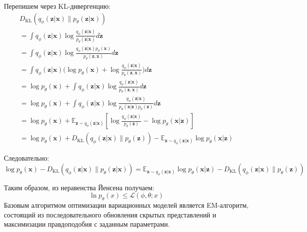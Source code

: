 Перепишем через KL-дивергенцию:
\begin{equation}
    \begin{aligned}
        & D_\text{KL}( q_\phi(\mathbf{z}\vert\mathbf{x}) \| p_\theta(\mathbf{z}\vert\mathbf{x}) ) & \\
        &=\int q_\phi(\mathbf{z} \vert \mathbf{x}) \log\frac{q_\phi(\mathbf{z} \vert \mathbf{x})}{p_\theta(\mathbf{z} \vert \mathbf{x})} d\mathbf{z} & \\
        &=\int q_\phi(\mathbf{z} \vert \mathbf{x}) \log\frac{q_\phi(\mathbf{z} \vert \mathbf{x})p_\theta(\mathbf{x})}{p_\theta(\mathbf{z}, \mathbf{x})} d\mathbf{z}\\
        &=\int q_\phi(\mathbf{z} \vert \mathbf{x}) \big( \log p_\theta(\mathbf{x}) + \log\frac{q_\phi(\mathbf{z} \vert \mathbf{x})}{p_\theta(\mathbf{z}, \mathbf{x})} \big) d\mathbf{z} & \\
        &=\log p_\theta(\mathbf{x}) + \int q_\phi(\mathbf{z} \vert \mathbf{x})\log\frac{q_\phi(\mathbf{z} \vert \mathbf{x})}{p_\theta(\mathbf{z}, \mathbf{x})} d\mathbf{z} \\
        &=\log p_\theta(\mathbf{x}) + \int q_\phi(\mathbf{z} \vert \mathbf{x})\log\frac{q_\phi(\mathbf{z} \vert \mathbf{x})}{p_\theta(\mathbf{x}\vert\mathbf{z})p_\theta(\mathbf{z})} d\mathbf{z} \\
        &=\log p_\theta(\mathbf{x}) + \mathbb{E}_{\mathbf{z}\sim q_\phi(\mathbf{z} \vert \mathbf{x})}[\log \frac{q_\phi(\mathbf{z} \vert \mathbf{x})}{p_\theta(\mathbf{z})} - \log p_\theta(\mathbf{x} \vert \mathbf{z})] &\\
        &=\log p_\theta(\mathbf{x}) + D_\text{KL}(q_\phi(\mathbf{z}\vert\mathbf{x}) \| p_\theta(\mathbf{z})) - \mathbb{E}_{\mathbf{z}\sim q_\phi(\mathbf{z}\vert\mathbf{x})}\log p_\theta(\mathbf{x}\vert\mathbf{z}) &
    \end{aligned}
\end{equation}

Следовательно:
\begin{equation}
    \log p_\theta(\mathbf{x}) - D_\text{KL}( q_\phi(\mathbf{z}\vert\mathbf{x}) \| p_\theta(\mathbf{z}\vert\mathbf{x}) ) = \mathbb{E}_{\mathbf{z}\sim q_\phi(\mathbf{z}\vert\mathbf{x})}\log p_\theta(\mathbf{x}\vert\mathbf{z}) - D_\text{KL}(q_\phi(\mathbf{z}\vert\mathbf{x}) \| p_\theta(\mathbf{z}))
\end{equation}
    
Таким образом, из неравенства Йенсена получаем: 
$$
    \ln p_\theta(x) \le \mathcal{L}(\phi,\theta;x)
$$
Базовым алгоритмом оптимизации вариационных моделей является EM-алгоритм, состоящий из последовательного обновления
скрытых представлений и максимизации правдоподобия с заданным параметрами.

